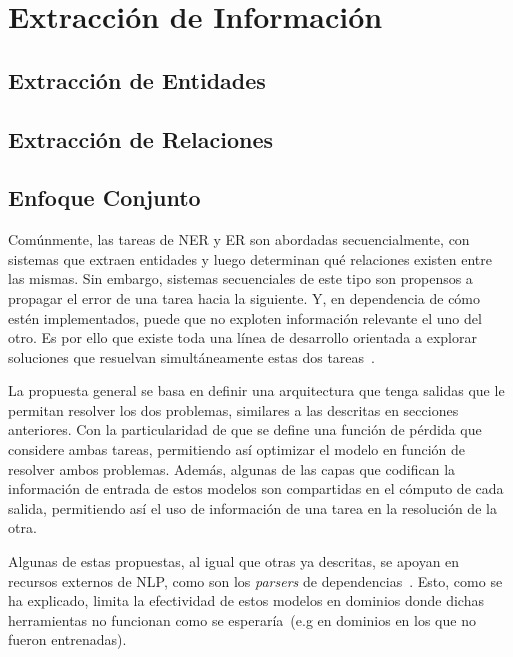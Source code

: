 \chapter{Extracción de Información}\label{chapter:information_extraction}

\section{Extracción de Entidades}

\section{Extracción de Relaciones}

\section{Enfoque Conjunto}

Comúnmente, las tareas de NER y ER son abordadas secuencialmente, con sistemas que extraen entidades y luego determinan qué relaciones existen entre las mismas.
Sin embargo, sistemas secuenciales de este tipo son propensos a propagar el error de una tarea hacia la siguiente.
Y, en dependencia de cómo estén implementados, puede que no exploten información relevante el uno del otro.
Es por ello que existe toda una línea de desarrollo orientada a explorar soluciones que resuelvan simultáneamente estas dos tareas~\cite{miwa2016end, li2017neural, bekoulis2018adversarial, bekoulis2018joint, li2019entity, nguyen2019end, giorgi2019end}.

La propuesta general se basa en definir una arquitectura que tenga salidas que le permitan resolver los dos problemas, similares a las descritas en secciones anteriores.
Con la particularidad de que se define una función de pérdida que considere ambas tareas, permitiendo así optimizar el modelo en función de resolver ambos problemas.
Además, algunas de las capas que codifican la información de entrada de estos modelos son compartidas en el cómputo de cada salida, permitiendo así el uso de información de una tarea en la resolución de la otra.

Algunas de estas propuestas, al igual que otras ya descritas, se apoyan en recursos externos de NLP, como son los \textit{parsers} de dependencias~\cite{miwa2016end, li2017neural}.
Esto, como se ha explicado, limita la efectividad de estos modelos en dominios donde dichas herramientas no funcionan como se esperaría~(e.g en dominios en los que no fueron entrenadas).

